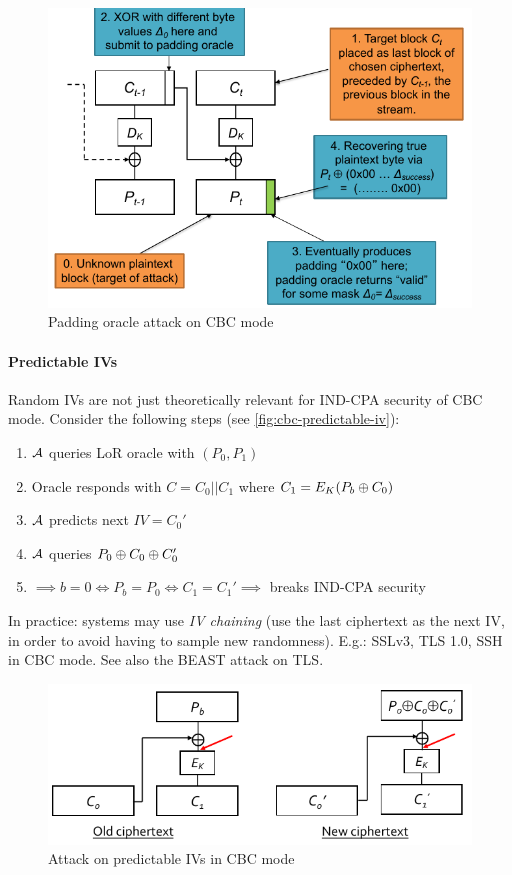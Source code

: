 \begin{figure}[h]
    \centering
	\includegraphics[scale=0.6]{images/cbc-padding-oracle-attack.png}
    \caption{Padding oracle attack on CBC mode}
    \label{fig:cbc-padding-oracle-attack}
\end{figure}

\paragraph{Predictable IVs}
Random IVs are not just theoretically relevant for IND-CPA security of CBC mode.
Consider the following steps (see \autoref{fig:cbc-predictable-iv}):
\begin{enumerate}
\item $\mathcal{A}$ queries LoR oracle with $(P_0, P_1)$
\item Oracle responds with $C = C_0||C_1$ where $C_1 = E_K(P_b \oplus C_0)$
\item $\mathcal{A}$ predicts next $IV=C_0'$
\item $\mathcal{A}$ queries $P_0 \oplus C_0 \oplus C_0'$
\item $\implies b = 0 \iff P_b = P_0 \iff C_1 = C_1' \implies$ breaks IND-CPA security
\end{enumerate}

In practice: systems may use \emph{IV chaining} (use the last ciphertext as the next IV, in order to avoid having to sample new randomness).
E.g.: SSLv3, TLS 1.0, SSH in CBC mode.
See also the BEAST attack on TLS.

\begin{figure}[h]
    \centering
	\includegraphics[scale=0.6]{images/cbc-predictable-iv.png}
    \caption{Attack on predictable IVs in CBC mode}
    \label{fig:cbc-predictable-iv}
\end{figure}



